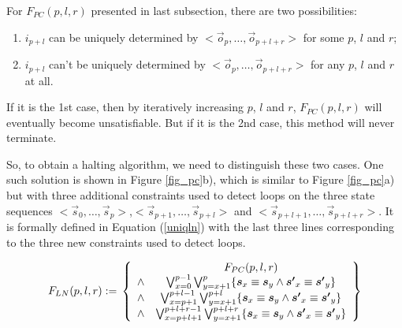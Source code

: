 \documentclass[runningheads,a4paper,orivec]{llncs}
\begin{document}
For $F_{PC}(p,l,r)$ presented in last subsection,
there are two possibilities:
\begin{enumerate}
 \item 
$i_{p+l}$ can be uniquely determined by $<\vec{o}_{p},\dots,\vec{o}_{p+l+r}>$ for some $p$, $l$ and $r$;
 \item 
$i_{p+l}$ can't be uniquely determined by $<\vec{o}_{p},\dots,\vec{o}_{p+l+r}>$ for any $p$, $l$ and $r$ at all.
\end{enumerate}

If it is the 1st case,
then by iteratively increasing  $p$, $l$ and $r$,
$F_{PC}(p,l,r)$ will eventually become unsatisfiable.
But if it is the 2nd case,
this method will never terminate.


So,
to obtain a halting algorithm,
we need to distinguish these two cases.
One such solution is shown in Figure \ref{fig_pc}b),
which is similar to Figure \ref{fig_pc}a) but with three additional constraints used to detect loops 
on the three state sequences $<\vec{s}_{0},\dots,\vec{s}_{p}>$,$<\vec{s}_{p+1},\dots,\vec{s}_{p+l}>$ and 
$<\vec{s}_{p+l+1},\dots,\vec{s}_{p+l+r}>$.
It is formally defined in Equation (\ref{uniqln}) with the last three lines corresponding to the three new constraints used to detect loops.

\begin{equation}\label{uniqln}
F_{LN}(p,l,r):=\\
\left\{
\begin{array}{cc}
&F_{PC}(p,l,r)\\
\wedge&\bigvee_{x=0}^{p-1}\bigvee_{y=x+1}^{p} \{\vec{s}_x\equiv \vec{s}_y\wedge \vec{s'}_x\equiv \vec{s'}_y\} \\
\wedge&\bigvee_{x=p+1}^{p+l-1}\bigvee_{y=x+1}^{p+l} \{\vec{s}_x\equiv \vec{s}_y\wedge \vec{s'}_x\equiv \vec{s'}_y\} \\
\wedge&\bigvee_{x=p+l+1}^{p+l+r-1}\bigvee_{y=x+1}^{p+l+r} \{\vec{s}_x\equiv \vec{s}_y\wedge \vec{s'}_x\equiv \vec{s'}_y\}
\end{array}
\right\}
\end{equation}
\end{document}
